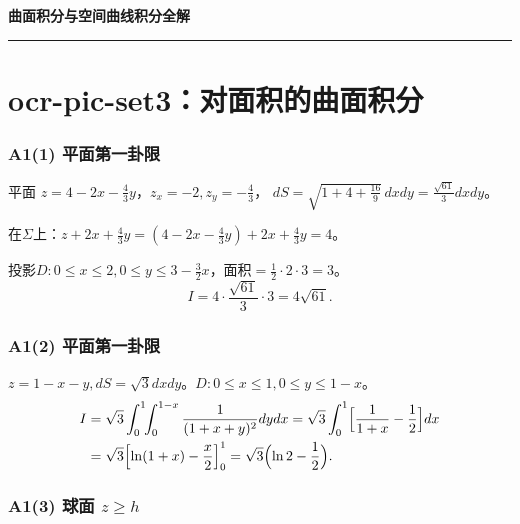 \documentclass[12pt,a4paper]{ctexart}
\newcommand{\answerbox}[1]{\begin{center}\fbox{\color{red}\large\bfseries #1}\end{center}}
\begin{document}
\begin{center}{\Huge\bfseries 曲面积分与空间曲线积分全解}\end{center}
\vspace{6pt}\hrule\vspace{6pt}

\part*{ocr-pic-set3：对面积的曲面积分}

\section{A1(1) 平面第一卦限}


平面 $z=4-2x-\frac{4}{3}y$，$z_x=-2,z_y=-\frac{4}{3}$，
$dS=\sqrt{1+4+\frac{16}{9}}\,dxdy=\frac{\sqrt{61}}{3}dxdy$。

在$\Sigma$上：$z+2x+\frac{4}{3}y=(4-2x-\frac{4}{3}y)+2x+\frac{4}{3}y=4$。

投影$D:0\le x\le2,0\le y\le3-\frac{3}{2}x$，面积$=\frac12\cdot2\cdot3=3$。
\[I=4\cdot\frac{\sqrt{61}}{3}\cdot3=4\sqrt{61}.\]
\answerbox{$4\sqrt{61}$}

\section{A1(2) 平面第一卦限}


$z=1-x-y,dS=\sqrt{3}dxdy$。$D:0\le x\le1,0\le y\le1-x$。
\begin{align*}
I&=\sqrt{3}\int_0^1\!\!\int_0^{1-x}\frac{1}{(1+x+y)^2}dydx
   =\sqrt{3}\int_0^1\Bigl[\frac{1}{1+x}-\frac12\Bigr]dx\\
  &=\sqrt{3}\Bigl[\ln(1+x)-\frac{x}{2}\Bigr]_0^1
   =\sqrt{3}\Bigl(\ln2-\frac12\Bigr).
\end{align*}
\answerbox{$\sqrt{3}(\ln2-\frac12)$}

\section{A1(3) 球面 $z\ge h$}

\end{document}
